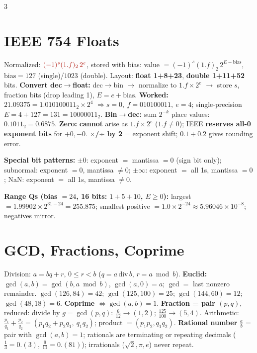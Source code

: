 \documentclass[9pt]{extarticle}
\newcommand{\hl}[1]{\textbf{\textcolor{BrickRed}{#1}}}
\begin{document}
\begin{multicols}{3}
\section{IEEE 754 Floats}
Normalized: $\textcolor{BrickRed}{(-1)^s(1.f)_2\,2^{e}}$, stored with bias: value $=(-1)^s(1.f)_2\,2^{E-\mathrm{bias}}$, $\mathrm{bias}=127$ (single)/$1023$ (double). Layout: \hl{float 1+8+23}, \hl{double 1+11+52} bits.
\hl{Convert dec$\to$float:} dec$\to$bin $\to$ normalize to $1.f\times2^e$ $\to$ store $s$, fraction bits (drop leading 1), $E=e+\mathrm{bias}$.
\textbf{Worked:} $21.09375=1.010100011_2\times2^4$ $\Rightarrow s{=}0,\ f{=}010100011,\ e{=}4$; single-precision $E=4+127=131=10000011_2$.
\hl{Bin$\to$dec:} sum $2^{-k}$ place values: $0.1011_2=0.6875$.
\hl{Zero:} \hl{cannot} arise as $1.f\times2^e$ ($1.f\ne0$); IEEE \hl{reserves all-0 exponent bits} for $+0,-0$. \hl{$\times$/$\div$ by 2} = exponent shift; $0.1+0.2$ gives rounding error.
\begin{obox}\raggedright
\textbf{Special bit patterns:} $\pm0$: exponent $=$ mantissa $=0$ (sign bit only); subnormal: exponent $=0$, mantissa $\ne0$; $\pm\infty$: exponent $=$ all 1s, mantissa $=0$; NaN: exponent $=$ all 1s, mantissa $\ne0$.
\end{obox}
\textbf{Range Qs (bias $=24$, 16 bits: $1+5+10$, $E\ge0$):} largest $=1.99902\times2^{31-24}=255.875$; smallest positive $=1.0\times2^{-24}\approx5.96046\times10^{-8}$; negatives mirror.

\section{GCD, Fractions, Coprime}
Division: $a=bq+r$, $0\le r<b$ ($q=a\,\mathrm{div}\,b$, $r=a\bmod b$).
\hl{Euclid:} $\gcd(a,b)=\gcd(b,a\bmod b)$, $\gcd(a,0)=a$; $\gcd=$ last nonzero remainder. $\gcd(126,84)=42$; $\gcd(125,100)=25$; $\gcd(144,60)=12$; $\gcd(48,18)=6$.
\hl{Coprime} $\iff\gcd(a,b)=1$.
\hl{Fraction = pair $(p,q)$}, reduced: divide by $g=\gcd(p,q)$: $\frac{6}{12}\to(1,2)$; $\frac{125}{100}\to(5,4)$. Arithmetic: $\frac{p_1}{q_1}+\frac{p_2}{q_2}=(p_1q_2+p_2q_1,\ q_1q_2)$; product $=(p_1p_2,q_1q_2)$. \hl{Rational number} $\frac ab$ = pair with $\gcd(a,b)=1$; rationals are terminating or repeating decimals ($\frac13=0.(3)$, $\frac9{11}=0.(81)$); irrationals ($\sqrt2,\pi,e$) never repeat.


\end{multicols}
\end{document}
